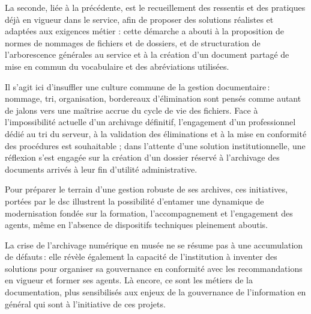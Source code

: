 La seconde, liée à la précédente, est le recueillement des ressentis et des pratiques déjà en vigueur dans le service, afin de proposer des solutions réalistes et adaptées aux exigences métier : cette démarche a abouti à la proposition de normes de nommages de fichiers et de dossiers, et de structuration de l'arborescence générales au service et à la création d'un document partagé de mise en commun du vocabulaire et des abréviations utilisées.


Il s’agit ici d’insuffler une culture commune de la gestion documentaire : nommage, tri, organisation, bordereaux d’élimination sont pensés comme autant de jalons vers une maîtrise accrue du cycle de vie des fichiers. Face à l’impossibilité actuelle d’un archivage définitif, l'engagement d'un professionnel dédié au tri du serveur, à la validation des éliminations et à la mise en conformité des procédures est souhaitable ; dans l'attente d'une solution institutionnelle, une réflexion s’est engagée sur la création d’un dossier réservé à l'archivage des documents arrivés à leur fin d'utilité administrative.


Pour préparer le terrain d'une gestion robuste de ses archives, ces initiatives, portées par le \ac{dsc} illustrent la possibilité d’entamer une dynamique de modernisation fondée sur la formation, l’accompagnement et l’engagement des agents, même en l’absence de dispositifs techniques pleinement aboutis.

\bigskip
\bigskip
\bigskip

La crise de l’archivage numérique en musée ne se résume pas à une accumulation de défauts : elle révèle également la capacité de l’institution à inventer des solutions pour organiser sa gouvernance en conformité avec les recommandations en vigueur et former ses agents. Là encore, ce sont les métiers de la documentation, plus sensibilisés aux enjeux de la gouvernance de l'information en général qui sont à l'initiative de ces projets.